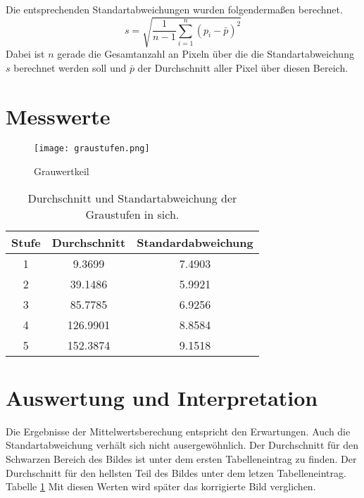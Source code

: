 Die entsprechenden Standartabweichungen wurden folgendermaßen berechnet.
\begin{equation}
s = \sqrt{\frac{1}{n-1}\sum_{i=1}^{n} (p_i- \bar{p})^2}
\end{equation}
Dabei ist $n$ gerade die Gesamtanzahl an Pixeln über die die Standartabweichung $s$ berechnet werden soll und $\bar{p}$ der Durchschnitt aller Pixel über diesen Bereich.

\section{Messwerte}
\label{chap:VERSUCH_1_MESSWERTE}
\begin{figure}[H]
\centering
\texttt{[image: graustufen.png]}
\caption{Grauwertkeil}
\label{img:Grauwertkeil}
\end{figure}
\begin{table}
\centering
\begin{tabular}{c|cc}
Stufe & Durchschnitt & Standardabweichung \\
\hline
1 & 9.3699 & 7.4903 \\
2 & 39.1486 & 5.9921 \\
3 & 85.7785 & 6.9256 \\
4 & 126.9901 & 8.8584 \\
5 & 152.3874 & 9.1518 \\
\end{tabular}
\caption{Durchschnitt und Standartabweichung der Graustufen in sich.}
\label{tab:GrauStufen_Mean}
\end{table}
\section{Auswertung und Interpretation}
\label{chap:VERSUCH_1_AUSWERTUNG}
Die Ergebnisse der Mittelwertsberechung entspricht den Erwartungen. Auch die Standartabweichung verhält sich nicht ausergewöhnlich.
Der Durchschnitt für den Schwarzen Bereich des Bildes ist unter dem ersten Tabelleneintrag zu finden. Der Durchschnitt für den hellsten Teil des Bildes unter dem letzen Tabelleneintrag. Tabelle \ref{tab:GrauStufen_Mean} Mit diesen Werten wird später das korrigierte Bild verglichen.
